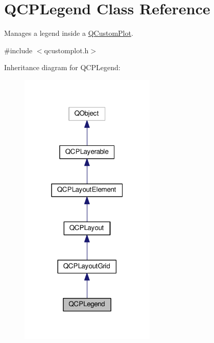 \hypertarget{classQCPLegend}{}\section{Q\+C\+P\+Legend Class Reference}
\label{classQCPLegend}


Manages a legend inside a \hyperlink{classQCustomPlot}{Q\+Custom\+Plot}.  




{\ttfamily \#include $<$qcustomplot.\+h$>$}



Inheritance diagram for Q\+C\+P\+Legend\+:\nopagebreak
\begin{figure}[H]
\begin{center}
\leavevmode
\includegraphics[width=184pt]{classQCPLegend__inherit__graph}
\end{center}
\end{figure}


